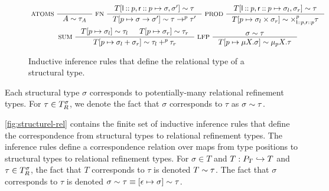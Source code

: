 \begin{figure}
  \centering
  \begin{gather*}
    \inference[ ATOMS ]{ }{ %
      A \reltyof \tau_A } 
    \inference[ FN ]{ 
      \upd{ T }{ \leftchild \cons p, \rightchild \cons p }{ \sigma, \sigma' } %
      \reltyof \tau }{
      \upd{ T }{ p }{ \sigma \to \sigma' } \reltyof \tau \to^p \tau' } 
    \inference[ PROD ]{
      \upd{ T }{ \leftchild \cons p, \rightchild \cons p }{ %
        \sigma_l, \sigma_r } \reltyof \tau }{
      \upd{ T }{ p }{ \sigma_l \times \sigma_r } \reltyof %
      \times_{ \leftchild \cons p, \rightchild \cons p }^{p} \tau } \\
    \inference[ SUM ]{
      \upd{ T }{ p }{ \sigma_l } \reltyof \tau_l &
      \upd{ T }{ p }{ \sigma_r } \reltyof \tau_r }{
      \upd{ T }{ p }{ \sigma_l + \sigma_r } \reltyof \tau_l +^p \tau_r } 
    \inference[ LFP ]{
      \sigma \reltyof \tau }{
      \upd{ T }{ p }{ \mu X. \sigma } \reltyof \mu_p X. \tau }
  \end{gather*}
  \caption{Inductive inference rules that define the relational type
    of a structural type.
     }
  \label{fig:structure-rel}
\end{figure}

Each structural type $\sigma$ corresponds to potentially-many
relational refinement types.
%
For $\tau \in T_{R}^{\sigma}$, we denote the fact that $\sigma$
corresponds to $\tau$ as $\sigma \sim \tau$.

\autoref{fig:structurel-rel} contains the finite set of inductive
inference rules that define the correspondence from structural types
to relational refinement types.
%
The inference rules define a correspondence relation over maps from
type positions to structural types to relational refinement types.
%
For $\sigma \in T$ and $T: P_T \hookrightarrow T$ and
$\tau \in T_{R}^{ \sigma }$, the fact that $T$ corresponds to
$\tau$ is denoted $T \sim \tau$.
%
The fact that $\sigma$ corresponds to $\tau$ is denoted
$\sigma \sim \tau \equiv [ \epsilon \mapsto \sigma ] \sim
\tau$.

